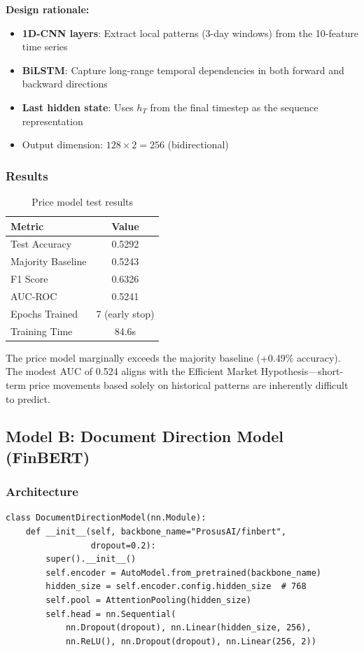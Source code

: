 \documentclass[12pt,a4paper]{article}
\begin{document}
\textbf{Design rationale:}
\begin{itemize}[noitemsep]
    \item \textbf{1D-CNN layers}: Extract local patterns (3-day windows) from the 10-feature time series
    \item \textbf{BiLSTM}: Capture long-range temporal dependencies in both forward and backward directions
    \item \textbf{Last hidden state}: Uses $h_T$ from the final timestep as the sequence representation
    \item Output dimension: $128 \times 2 = 256$ (bidirectional)
\end{itemize}

\subsubsection{Results}

\begin{table}[H]
\centering
\begin{tabular}{lc}
\toprule
\textbf{Metric} & \textbf{Value} \\
\midrule
Test Accuracy & 0.5292 \\
Majority Baseline & 0.5243 \\
F1 Score & 0.6326 \\
AUC-ROC & 0.5241 \\
Epochs Trained & 7 (early stop) \\
Training Time & 84.6s \\
\bottomrule
\end{tabular}
\caption{Price model test results}
\label{tab:price_results}
\end{table}

\noindent The price model marginally exceeds the majority baseline (+0.49\% accuracy). The modest AUC of 0.524 aligns with the Efficient Market Hypothesis---short-term price movements based solely on historical patterns are inherently difficult to predict.

\subsection{Model B: Document Direction Model (FinBERT)}

\subsubsection{Architecture}

\begin{lstlisting}[caption={DocumentDirectionModel (\texttt{src/models/document\_model.py})}]
class DocumentDirectionModel(nn.Module):
    def __init__(self, backbone_name="ProsusAI/finbert",
                 dropout=0.2):
        super().__init__()
        self.encoder = AutoModel.from_pretrained(backbone_name)
        hidden_size = self.encoder.config.hidden_size  # 768
        self.pool = AttentionPooling(hidden_size)
        self.head = nn.Sequential(
            nn.Dropout(dropout), nn.Linear(hidden_size, 256),
            nn.ReLU(), nn.Dropout(dropout), nn.Linear(256, 2))
\end{lstlisting}
\end{document}
